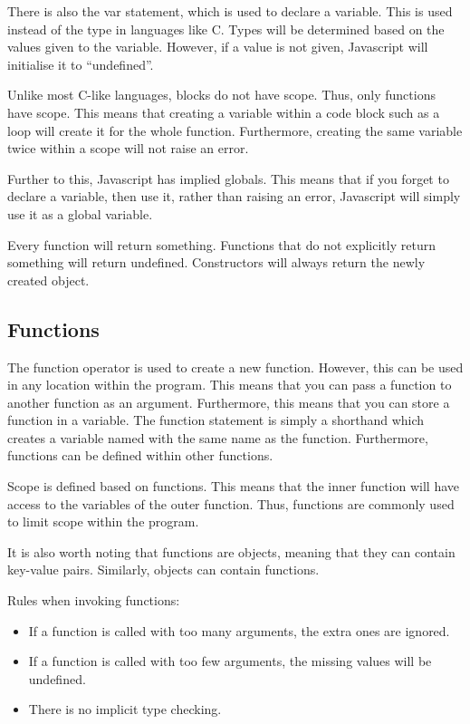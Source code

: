 			There is also the var statement, which is used to declare a variable.
			This is used instead of the type in languages like C.
			Types will be determined based on the values given to the variable.
			However, if a value is not given, Javascript will initialise it to ``undefined''.

			Unlike most C-like languages, blocks do not have scope.
			Thus, only functions have scope.
			This means that creating a variable within a code block such as a loop will create it for the whole function.
			Furthermore, creating the same variable twice within a scope will not raise an error.

			Further to this, Javascript has implied globals.
			This means that if you forget to declare a variable, then use it,
			rather than raising an error, Javascript will simply use it as a global variable.

			Every function will return something.
			Functions that do not explicitly return something will return undefined.
			Constructors will always return the newly created object.

		\subsection{Functions}
			The function operator is used to create a new function.
			However, this can be used in any location within the program.
			This means that you can pass a function to another function as an argument.
			Furthermore, this means that you can store a function in a variable.
			The function statement is simply a shorthand which creates a variable named with the same name as the function.
			Furthermore, functions can be defined within other functions.

			Scope is defined based on functions.
			This means that the inner function will have access to the variables of the outer function.
			Thus, functions are commonly used to limit scope within the program.

			It is also worth noting that functions are objects, meaning that they can contain key-value pairs.
			Similarly, objects can contain functions.

			Rules when invoking functions:
			\begin{itemize}
				\item If a function is called with too many arguments, the extra ones are ignored.
				\item If a function is called with too few arguments, the missing values will be undefined.
				\item There is no implicit type checking.
			\end{itemize}

